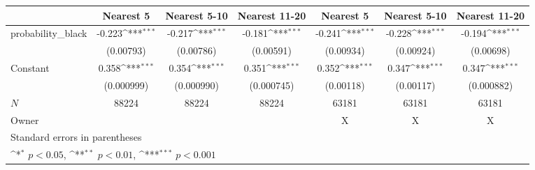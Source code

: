 {
\def\sym#1{\ifmmode^{#1}\else\(^{#1}\)\fi}
\begin{tabular}{l*{6}{c}}
\hline\hline
            &\multicolumn{1}{c}{Nearest 5}&\multicolumn{1}{c}{Nearest 5-10}&\multicolumn{1}{c}{Nearest 11-20}&\multicolumn{1}{c}{Nearest 5}&\multicolumn{1}{c}{Nearest 5-10}&\multicolumn{1}{c}{Nearest 11-20}\\
\hline
probability\_black&      -0.223\sym{***}&      -0.217\sym{***}&      -0.181\sym{***}&      -0.241\sym{***}&      -0.228\sym{***}&      -0.194\sym{***}\\
            &   (0.00793)         &   (0.00786)         &   (0.00591)         &   (0.00934)         &   (0.00924)         &   (0.00698)         \\
[1em]
Constant    &       0.358\sym{***}&       0.354\sym{***}&       0.351\sym{***}&       0.352\sym{***}&       0.347\sym{***}&       0.347\sym{***}\\
            &  (0.000999)         &  (0.000990)         &  (0.000745)         &   (0.00118)         &   (0.00117)         &  (0.000882)         \\
\hline
\(N\)       &       88224         &       88224         &       88224         &       63181         &       63181         &       63181         \\
Owner       &                     &                     &                     &           X         &           X         &           X         \\
\hline\hline
\multicolumn{7}{l}{\footnotesize Standard errors in parentheses}\\
\multicolumn{7}{l}{\footnotesize \sym{*} \(p<0.05\), \sym{**} \(p<0.01\), \sym{***} \(p<0.001\)}\\
\end{tabular}
}
